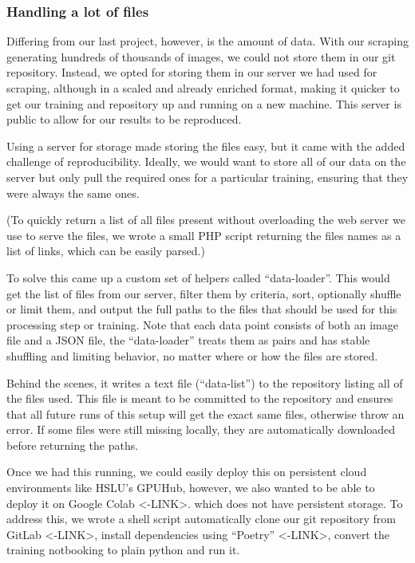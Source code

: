 \documentclass{article}
\begin{document}
\subsubsection{Handling a lot of files}\label{handling-a-lot-of-files}

Differing from our last project, however, is the amount of data. With
our scraping generating hundreds of thousands of images, we could not
store them in our git repository. Instead, we opted for storing them in
our server we had used for scraping, although in a scaled and already
enriched format, making it quicker to get our training and repository up
and running on a new machine. This server is public to allow for our
results to be reproduced.

Using a server for storage made storing the files easy, but it came with
the added challenge of reproducibility. Ideally, we would want to store
all of our data on the server but only pull the required ones for a
particular training, ensuring that they were always the same ones.

(To quickly return a list of all files present without overloading the
web server we use to serve the files, we wrote a small PHP script
returning the files names as a list of links, which can be easily
parsed.)

To solve this came up a custom set of helpers called ``data-loader''.
This would get the list of files from our server, filter them by
criteria, sort, optionally shuffle or limit them, and output the full
paths to the files that should be used for this processing step or
training. Note that each data point consists of both an image file and a
JSON file, the ``data-loader'' treats them as pairs and has stable
shuffling and limiting behavior, no matter where or how the files are
stored.

Behind the scenes, it writes a text file (``data-list'') to the
repository listing all of the files used. This file is meant to be
committed to the repository and ensures that all future runs of this
setup will get the exact same files, otherwise throw an error. If some
files were still missing locally, they are automatically downloaded
before returning the paths.

Once we had this running, we could easily deploy this on persistent
cloud environments like HSLU's GPUHub, however, we also wanted to be
able to deploy it on Google Colab \textless-LINK\textgreater. which does
not have persistent storage. To address this, we wrote a shell script
automatically clone our git repository from GitLab
\textless-LINK\textgreater, install dependencies using ``Poetry''
\textless-LINK\textgreater, convert the training notbooking to plain
python and run it.
\end{document}
